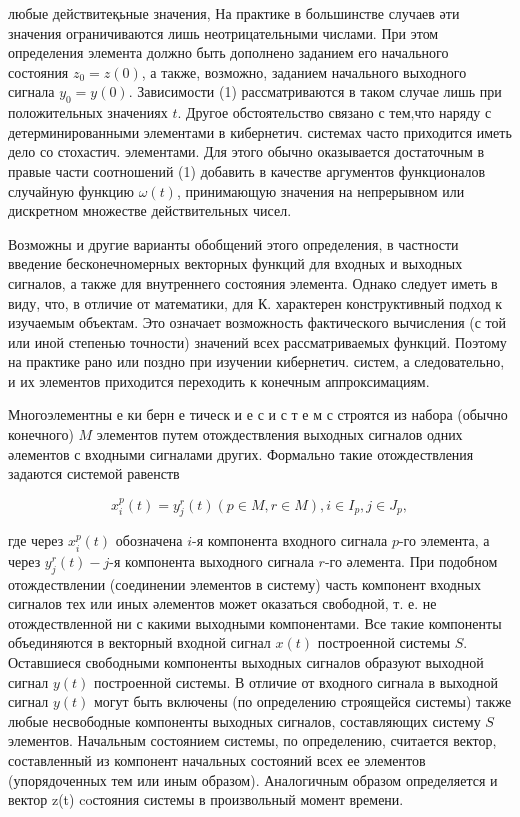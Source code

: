 \documentclass[10pt]{article}
\begin{document}
любые действитеқьные значения, На практике в большинстве случаев әти значения ограничиваются лишь неотрицательными числами. При этом определения элемента должно быть дополнено заданием его начального состояния $z_{0}=z(0)$, а также, возможно, заданием начального выходного сигнала $y_{0}=y(0)$. Зависимости (1) рассматриваются в таком случае лишь при положительных значениях $t$. Другое обстоятельство связано с тем,что наряду с детерминированными элементами в кибернетич. системах часто приходится иметь дело со стохастич. элементами. Для этого обычно оказывается достаточным в правые части соотношений (1) добавить в качестве аргументов функционалов случайную функцию $\omega(t)$, принимающую значения на непрерывном или дискретном множестве действительных чисел.



Возможны и другие варианты обобщений этого определения, в частности введение бесконечномерных векторных функций для входных и выходных сигналов, а также для внутреннего состояния элемента. Однако следует иметь в виду, что, в отличие от математики, для К. характерен конструктивный подход к изучаемым объектам. Это означает возможность фактического вычисления (с той или иной степенью точности) значений всех рассматриваемых функций. Поэтому на практике рано или поздно при изучении кибернетич. систем, а следовательно, и их элементов приходится переходить к конечным аппроксимациям.



Многоэлементны е ки берн е тическ и е с и с т е м с строятся из набора (обычно конечного) $M$ элементов путем отождествления выходных сигналов одних әлементов с входными сигналами других. Формально такие отождествления задаются системой равенств



\[

x_{i}^{p}(t)=y_{j}^{r}(t)(p \in M, r \in M), i \in I_{p}, j \in J_{p},

\]



где через $x_{i}^{p}(t)$ обозначена $i$-я компонента входного сигнала $p$-го элемента, а через $y_{j}^{r}(t)-j$-я компонента выходного сигнала $r$-го әлемента. При подобном отождествлении (соединении элементов в систему) часть компонент входных сигналов тех или иных әлементов может оказаться свободной, т. е. не отождествленной ни с какими выходными компонентами. Все такие компоненты объединяются в векторный входной сигнал $x(t)$ построенной системы $S$. Оставшиеся свободными компоненты выходных сигналов образуют выходной сигнал $y(t)$ построенной системы. В отличие от входного сигнала в выходной сигнал $y(t)$ могут быть включены (по определению строящейся системы) также любые несвободные компоненты выходных сигналов, составляющих систему $S$ элементов. Начальным состоянием системы, по определению, считается вектор, составленный из компонент начальных состояний всех ее элементов (упорядоченных тем или иным образом). Аналогичным образом определяется и вектор z(t) coстояния системы в произвольный момент времени.
\end{document}
